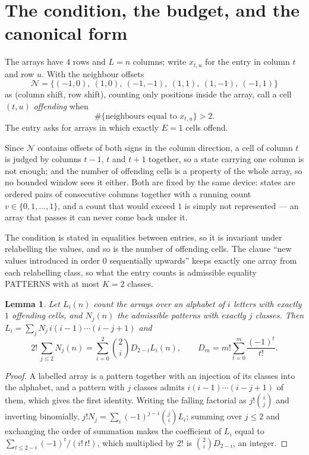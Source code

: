 \documentclass[11pt,a4paper]{article}
\theoremstyle{plain}
\newtheorem{lemma}[theorem]{Lemma}
\theoremstyle{definition}
\begin{document}
\section{The condition, the budget, and the canonical form}

The arrays have $4$ rows and $L=n$ columns; write $x_{t,u}$ for the entry in
column $t$ and row $u$. With the neighbour offsets
\[
\mathcal N=\{(-1,0),\ (1,0),\ (-1,-1),\ (1,1),\ (1,-1),\ (-1,1)\}
\]
as (column shift, row shift), counting only positions inside the array, call a cell
$(t,u)$ \emph{offending} when
\[
\#\{\text{neighbours equal to }x_{t,u}\}>2 .
\]
The entry asks for arrays in which exactly $E=1$ cells offend.

Since $\mathcal N$ contains offsets of both signs in the column direction, a cell of column
$t$ is judged by columns $t-1$, $t$ and $t+1$ together, so a state carrying one column is not
enough; and the number of offending cells is a property of the whole array, so no bounded
window sees it either. Both are fixed by the same device: states are ordered pairs of
consecutive columns together with a running count $v\in\{0,1,\dots,1\}$, and a count that
would exceed $1$ is simply not represented --- an array that passes it can never come back
under it.

The condition is stated in equalities between entries, so it is invariant under relabelling
the values, and so is the number of offending cells. The clause ``new values introduced in
order $0$ sequentially upwards'' keeps exactly one array from each relabelling class, so what
the entry counts is admissible equality PATTERNS with at most $K=2$ classes.

\begin{lemma}\label{lem:inv}
Let $L_i(n)$ count the arrays over an alphabet of $i$ letters with exactly $1$ offending
cells, and $N_j(n)$ the admissible patterns with exactly $j$ classes. Then
$L_i=\sum_j N_j\,i(i-1)\cdots(i-j+1)$ and
\[
2!\,\sum_{j\le2}N_j(n)=\sum_{i=0}^{2}\binom{2}{i}D_{2-i}L_i(n),
\qquad D_m=m!\sum_{t=0}^{m}\frac{(-1)^t}{t!} .
\]
\end{lemma}

\begin{proof}
A labelled array is a pattern together with an injection of its classes into the alphabet,
and a pattern with $j$ classes admits $i(i-1)\cdots(i-j+1)$ of them, which gives the first
identity. Writing the falling factorial as $j!\binom{i}{j}$ and inverting binomially,
$j!N_j=\sum_i(-1)^{j-i}\binom{j}{i}L_i$; summing over $j\le2$ and exchanging the
order of summation makes the coefficient of $L_i$ equal to
$\sum_{t\le2-i}(-1)^t/(i!\,t!)$, which multiplied by $2!$ is
$\binom{2}{i}D_{2-i}$, an integer.
\end{proof}
\end{document}
